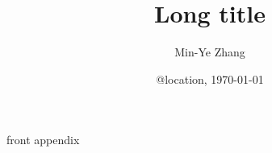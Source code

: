 \documentclass{beamer}
\author{Min-Ye Zhang}
\date[\today]{@location, \today}
\title[Short title]{Long title}
\institute[CCME, PKU]{College of Chemistry and Molecular Engineering\\ Peking University}
\begin{document}
{front}
{appendix}
\end{document}
